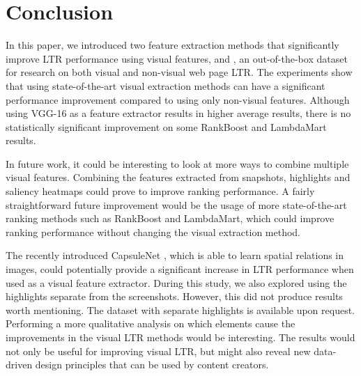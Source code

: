 
\section{Conclusion}
In this paper, we introduced two feature extraction methods that significantly improve \ac{LTR} performance using visual features, and \datasetname, an out-of-the-box dataset for research on both visual and non-visual web page \ac{LTR}.
The experiments show that using state-of-the-art visual extraction methods can have a significant performance improvement compared to using only non-visual features. Although using VGG-16 as a feature extractor results in higher average results, there is no statistically significant improvement on some RankBoost and LambdaMart results. %

In future work, it could be interesting to look at more ways to combine multiple visual features. Combining the features extracted from snapshots, highlights and saliency heatmaps could prove to improve ranking performance. 
A fairly straightforward future improvement would be the usage of more state-of-the-art ranking methods such as RankBoost and LambdaMart, which could improve ranking performance without changing the visual extraction method.

The recently introduced CapsuleNet \cite{sabour2017dynamic}, which is able to learn spatial relations in images, could potentially provide a significant increase in \ac{LTR} performance when used as a visual feature extractor.  
During this study, we also explored using the highlights separate from the screenshots. 
However, this did not produce results worth mentioning. 
The dataset with separate highlights is available upon request. 
Performing a more qualitative analysis on which elements cause the improvements in the visual \ac{LTR} methods would be interesting. 
The results would not only be useful for improving visual \ac{LTR}, but might also reveal new data-driven design principles that can be used by content creators. 